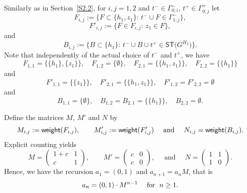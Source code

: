 \documentclass[11pt]{article}
\providecommand{\1}{\mathBB{1}}
\newcommand{\mbu}{\quad\mbox{ and }\quad}
\newcommand{\mf}{\quad\mbox{\;for \;}}
\def\SPT{\mathsf{ST}}
\newcommand{\weight}{\mathop{\mbox{\sf weight}}}
\begin{document}
Similarly as in Section~\ref{S2.2}, for $i,j=1,2$ and $t^-\in\Gamma^-_{0;i}$, $t^+\in\Gamma^+_{0;j}$ let
\begin{equation}
\label{E3.01}
F_{i,j}:=\big\{F\subset\{h_{1},z_{1}\}:\,t^-\cup F\in\Gamma^-_{1;j}\big\},
\end{equation}
\begin{equation}
\label{E3.02}
F'_{i,j}:=\big\{F\in F_{i,j}:\,z_1\in F\big\},
\end{equation}
and
\begin{equation}
\label{E3.03}
B_{i,j}:=\big\{B\subset \{h_1\}:\,t^-\cup B\cup t^+\in\SPT\big(G^{H_2}\big)\big\}.
\end{equation}
Note that independently of the actual choice of $t^-$ and $t^+$, we have
$$F_{1,1}=\big\{\{h_{1}\},\{z_{1}\}\big\},\quad
F_{1,2}=\{\emptyset\},\quad
F_{2,1}=\big\{\{h_{1},z_{1}\}\big\},\quad
F_{2,2}=\big\{\{h_{1}\}\big\}
$$
and
$$F'_{1,1}=\big\{\{z_{1}\}\big\},\quad
F'_{2,1}=\big\{\{h_{1},z_{1}\}\big\},\quad
F'_{1,2}=F'_{2,2}=\emptyset
$$
and
$$B_{1,1}=\{\emptyset\},\quad
B_{1,2}=B_{2,1}=\big\{\{h_{1}\}\big\},\quad
B_{2,2}=\emptyset.
$$

Define the matrices $M$, $M'$ and $N$ by
\begin{equation}
\label{E3.04}
M_{i,j}:=\weight(F_{i,j}),\qquad M'_{i,j}:=\weight(F'_{i,j})\mbu N_{i,j}=\weight(B_{i,j}).\end{equation}
Explicit counting yields
\begin{equation}
\label{E3.05}
M=\left(\begin{array}{cc}
1+c&1\\c&1
\end{array}\right),\qquad
M'=\left(\begin{array}{cc}
c&0\\c&0
\end{array}\right),\mbu
N=\left(\begin{array}{cc}
1&1\\1&0
\end{array}\right).
\end{equation}
Hence, we have the recursion $a_1=(0,1)$ and $a_{n+1}=a_nM$, that is
\begin{equation}
\label{E3.06}
a_n=(0,1)\cdot M^{n-1}\mf n\geq1.
\end{equation}
\end{document}
